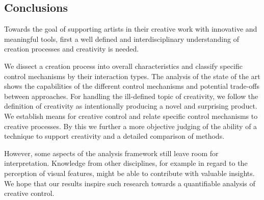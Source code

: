 

\subsection{Conclusions}

Towards the goal of supporting artists in their creative work with innovative and meaningful tools, first a well defined and interdisciplinary understanding of creation processes and creativity is needed.

We dissect a creation process into overall characteristics and classify specific control mechanisms by their interaction types. The analysis of the state of the art shows the capabilities of the different control mechanisms and potential trade-offs between approaches. For handling the ill-defined topic of creativity, we follow the definition of creativity as intentionally producing a novel and surprising product. We establish means for creative control and relate specific control mechanisms to creative processes. By this we further a more objective judging of the ability of a technique to support creativity and a detailed comparison of methods. 

However, some aspects of the analysis framework still leave room for interpretation. Knowledge from other disciplines, for example in regard to the perception of visual features, might be able to contribute with valuable insights. We hope that our results inspire such research towards a quantifiable analysis of creative control.



